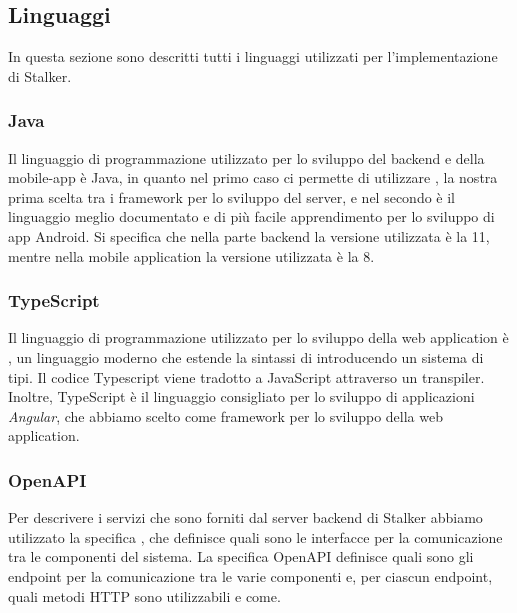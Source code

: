 \documentclass[../../../manuale-manutentore.tex]{subfiles}
\begin{document}
\subsection{Linguaggi}%
\label{sub:linguaggi}
In questa sezione sono descritti tutti i linguaggi utilizzati per l'implementazione di Stalker.

\subsubsection{Java}%
\label{subs:java}

Il linguaggio di programmazione utilizzato per lo sviluppo del backend e della mobile-app è Java, in quanto nel primo caso ci permette di utilizzare , la nostra prima scelta tra i framework per lo sviluppo del server, e nel secondo è il linguaggio meglio documentato e di più facile apprendimento per lo sviluppo di app Android.
Si specifica che nella parte backend la versione utilizzata è la 11, mentre nella mobile application la versione utilizzata è la 8.

\subsubsection{TypeScript}%
\label{subs:typescript}

Il linguaggio di programmazione utilizzato per lo sviluppo della web application è , un linguaggio moderno che estende la sintassi di  introducendo un sistema di tipi.
Il codice Typescript viene tradotto a JavaScript attraverso un transpiler.
Inoltre, TypeScript è il linguaggio consigliato per lo sviluppo di applicazioni \textit{Angular}, che abbiamo scelto come framework per lo sviluppo della web application.

\subsubsection{OpenAPI}%
\label{subs:openapi}

Per descrivere i servizi che sono forniti dal server backend di Stalker abbiamo utilizzato la specifica , che definisce quali sono le interfacce per la comunicazione tra le componenti del sistema.
La specifica OpenAPI definisce quali sono gli endpoint per la comunicazione tra le varie componenti e, per ciascun endpoint, quali metodi HTTP sono utilizzabili e come\@.
\end{document}
